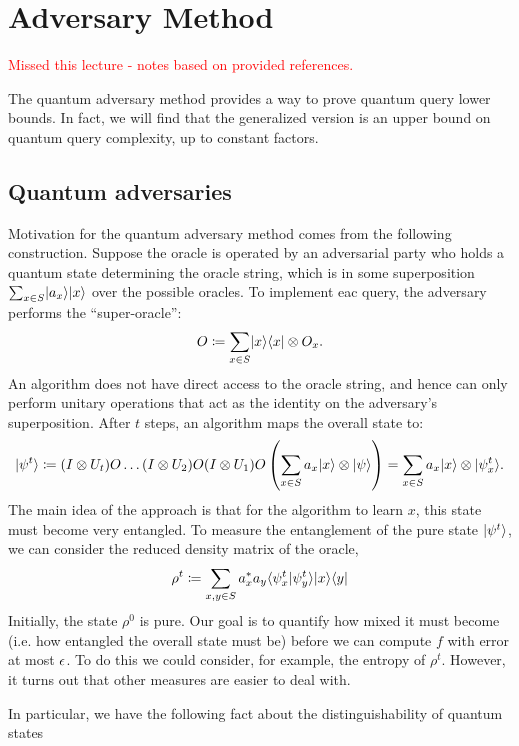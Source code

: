 \section{Adversary Method}
\textcolor{red}{Missed this lecture - notes based on provided references.}

The quantum adversary method provides a way to prove quantum query lower bounds. In fact, we will find that the generalized version is an upper bound on quantum query complexity, up to constant factors.

\subsection*{Quantum adversaries}
Motivation for the quantum adversary method comes from the following construction. Suppose the oracle is operated by an adversarial party who holds a quantum state determining the oracle string, which is in some superposition $\sum_{x \in S}\lvert a_x \rangle\lvert x \rangle$ over the possible oracles. To implement eac query, the adversary performs the ``super-oracle'':
\begin{equation}
    O \coloneqq \sum_{x \in S}\lvert x \rangle \langle x \rvert \otimes O_x.
\end{equation}
An algorithm does not have direct access to the oracle string, and hence can only perform unitary operations that act as the identity on the adversary's superposition. After $t$ steps, an algorithm maps the overall state to:
\begin{equation}
    \lvert \psi^t \rangle \coloneqq (I \otimes U_t)O\ldots (I \otimes U_2)O(I \otimes U_1)O\left(\sum_{x \in S}a_x \lvert x \rangle \otimes \lvert \psi \rangle\right) = \sum_{x \in S}a_x\lvert x \rangle \otimes \lvert \psi^t_x \rangle.
\end{equation}
The main idea of the approach is that for the algorithm to learn $x$, this state must become very entangled. To measure the entanglement of the pure state $\lvert \psi^t \rangle$, we can consider the reduced density matrix of the oracle,
\begin{equation}
    \rho^t \coloneqq \sum_{x, y \in S}a_x^* a_y\langle \psi_x^t \lvert \psi_y^t \rangle\lvert x \rangle \langle y \rvert
\end{equation}
Initially, the state $\rho^0$ is pure. Our goal is to quantify how mixed it must become (i.e. how entangled the overall state must be) before we can compute $f$ with error at most $\epsilon$. To do this we could consider, for example, the entropy of $\rho^t$. However, it turns out that other measures are easier to deal with.

In particular, we have the following fact about the distinguishability of quantum states

